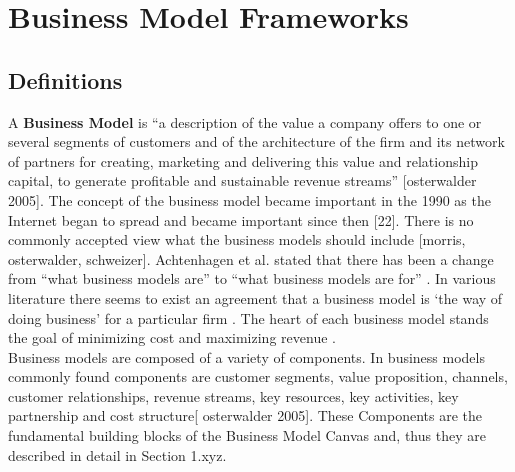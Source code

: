 \section{Business Model Frameworks}
	
	\subsection{Definitions}
	 A \textbf{Business Model} is ``a description of the value a company offers to one or several segments of customers and of the architecture of the firm and its network of partners for creating, marketing and delivering this value and relationship capital, to generate profitable and sustainable revenue streams'' [osterwalder 2005]. The concept of the business model became important in the 1990 as the Internet began to spread and became important since then [22]. There is no commonly accepted view what the business models should include [morris, osterwalder, schweizer]. Achtenhagen et al. stated that there has been a change from ``what business models are'' to ``what business models are for'' \cite{westerlund}. In various literature there seems to exist an agreement that a business model is `the way of doing business' for a particular firm \cite{westerlund}. The heart of each business model stands the goal of minimizing cost and maximizing revenue \cite{ju}.\\
	 Business models are composed of a variety of components. In business models commonly found components are customer segments, value proposition, channels, customer relationships, revenue streams, key resources, key activities, key partnership and cost structure[ osterwalder 2005]. These Components are the fundamental building blocks of the Business Model Canvas and, thus they are described in detail in Section 1.xyz. \\

